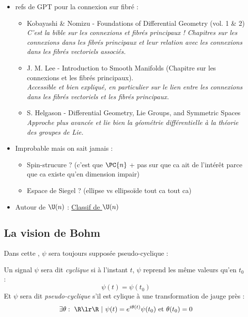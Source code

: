 \begin{itemize}
	\item refs de GPT pour la connexion sur fibré :
	\begin{itemize}
		\item Kobayashi \& Nomizu - Foundations of Differential Geometry (vol. 1 \& 2)
		\\
		\textit{C'est la bible sur les connexions et fibrés principaux ! Chapitres sur les connexions dans les fibrés principaux et leur relation avec les connexions dans les fibrés vectoriels associés.}
		
		\item J. M. Lee - Introduction to Smooth Manifolds (Chapitre sur les connexions et les fibrés principaux).
		\\
		\textit{Accessible et bien expliqué, en particulier sur le lien entre les connexions dans les fibrés vectoriels et les fibrés principaux.}
		
		\item S. Helgason - Differential Geometry, Lie Groups, and Symmetric Spaces
		\\
		\textit{Approche plus avancée et lie bien la géométrie différentielle à la théorie des groupes de Lie.}
	\end{itemize}
	
	\item Improbable mais on sait jamais :
	\begin{itemize}
		\item Spin-strucure ? (c'est que $\PC{n}$ + pas sur que ca ait de l'intérêt parce que ca existe qu'en dimension impair)
		
		\item Espace de Siegel ? (ellipse vs ellipsoïde tout ca tout ca)
	\end{itemize}
	
	\item Autour de $\U(n)$ : \href{https://en.wikipedia.org/wiki/Classifying_space_for_U(n)}{Classif de $\U(n)$}
	
\end{itemize}




\subsection{La vision de Bohm \cite[fig. 4.3]{bohm_geometric_2003}}
\label{subsec:lift_approch}

Dans cette , $\psi$ sera toujours supposée pseudo-cyclique :
\begin{definition}
	Un signal $\psi$ sera dit \emph{cyclique} si à l'instant $t$, $\psi$ reprend les même valeurs qu'en $t_0$ :
	\[\psi(t)=\psi(t_0)\]
	Et $\psi$ sera dit \emph{pseudo-cyclique} s'il est cylique à une transformation de jauge près :
	\[\exists \theta:\ \R\lr\R\ |\ \psi(t) = e^{i\theta(t)}\psi(t_0)\text{ et } \theta(t_0)=0\]
\end{definition}


